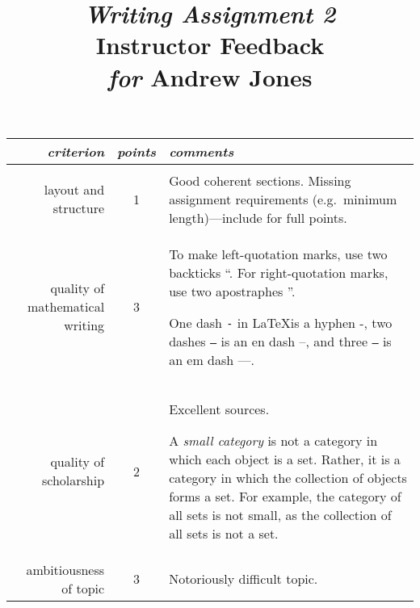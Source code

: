 \documentclass{article}
\title{{\Large \emph{Writing Assignment 2}} \\ Instructor Feedback \\[-2pt] {\normalsize \emph{for} Andrew Jones}}
\author{}\date{}
\begin{document}
\maketitle
\thispagestyle{empty}


\vspace{.3cm}
\begin{center}
\begin{tabular}{rcp{6cm}}
	\emph{criterion}	&\emph{points}		&\emph{comments}	\\ \hline
				&			&			\\[-.3cm]
	layout and structure
		&1
		&Good coherent sections. Missing assignment requirements (e.g.\ minimum length)---include for full points.
		\\[1cm]
	quality of mathematical writing
		&3
		&To make left-quotation marks, use two backticks ``. For right-quotation marks, use two apostraphes ''.\newline

		One dash \texttt{-} in \LaTeX is a hyphen -, two dashes \texttt{--} is an en dash --, and three \texttt{---} is an em dash ---.
		\\[1cm]
	quality of scholarship
		&2
		&Excellent sources. 

		A \emph{small category} is not a category in which each object is a set. Rather, it is a category in which the collection of objects forms a set. For example, the category of all sets is not small, as the collection of all sets is not a set.
		\\[1cm]
	ambitiousness of topic
		&3
		&Notoriously difficult topic.
\end{tabular}
\end{center}
\end{document}
